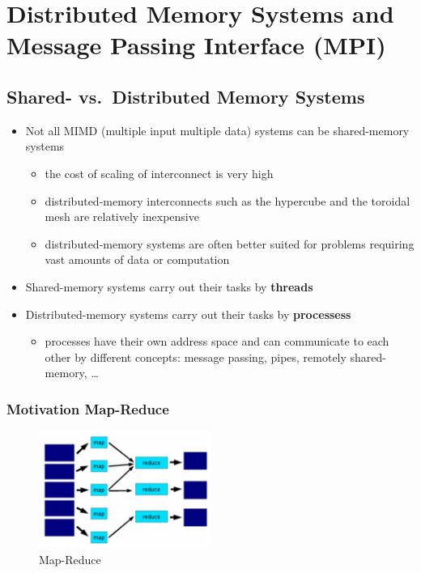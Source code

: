 \hypertarget{distributed-memory-systems-and-message-passing-interface-mpi}{%
\section{Distributed Memory Systems and Message Passing Interface
(MPI)}\label{distributed-memory-systems-and-message-passing-interface-mpi}}

\hypertarget{shared--vs.distributed-memory-systems}{%
\subsection{Shared- vs.~Distributed Memory
Systems}\label{shared--vs.distributed-memory-systems}}

\begin{itemize}
\tightlist
\item
  Not all MIMD (multiple input multiple data) systems can be
  shared-memory systems

  \begin{itemize}
  \tightlist
  \item
    the cost of scaling of interconnect is very high
  \item
    distributed-memory interconnects such as the hypercube and the
    toroidal mesh are relatively inexpensive
  \item
    distributed-memory systems are often better suited for problems
    requiring vast amounts of data or computation
  \end{itemize}
\item
  Shared-memory systems carry out their tasks by \textbf{threads}
\item
  Distributed-memory systems carry out their tasks by
  \textbf{processess}

  \begin{itemize}
  \tightlist
  \item
    processes have their own address space and can communicate to each
    other by different concepts: message passing, pipes, remotely
    shared- memory, \ldots{}
  \end{itemize}
\end{itemize}

\hypertarget{motivation-map-reduce}{%
\subsubsection{Motivation Map-Reduce}\label{motivation-map-reduce}}

\begin{figure}[H]
\centering
\includegraphics[width=0.5\textwidth]{figures/mapreduce.png}
\caption{Map-Reduce}
\end{figure}

